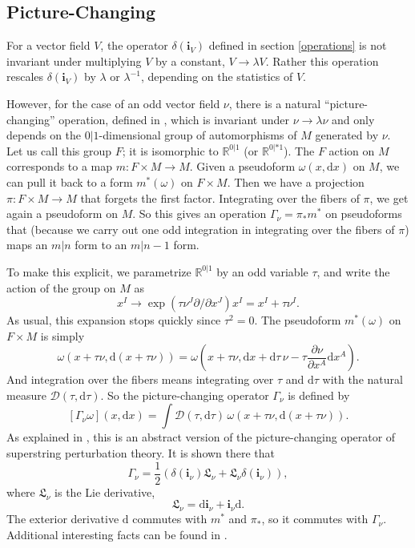 \documentclass[11pt,a4paper]{article}
\def\D{{\mathcal D}}
\def\d{{\mathrm d}}
\def\R{{\mathbb R}}
\def\D{{\mathcal D}}
\def\LL{{ \mathfrak L}}
\def\i{{\mathbf i}}
\begin{document}
\subsection{Picture-Changing}\label{picturechanging}

For a vector field $V$, the operator $\delta(\i_V)$ defined in section \ref{operations} is not invariant under multiplying $V$ by a constant, $V\to \lambda V$.
Rather this operation rescales $\delta(\i_V)$ by $\lambda$ or $\lambda^{-1}$, depending on the statistics of $V$.  

However, for the case of an odd vector field $\nu$, there is a natural ``picture-changing'' operation, defined in \cite{Beltwo}, which is invariant under $\nu\to\lambda\nu$
and only depends on the $0|1$-dimensional group of automorphisms of $M$ generated by $\nu$.  Let us call this group $F$; it is isomorphic to $\R^{0|1}$ (or
$\R^{0|*1}$).  
The $F$ action on $M$ corresponds to a map $m:F\times M\to M$.  Given a pseudoform $\omega(x,\d x)$ on $M$, we can pull it back to a form $m^*(\omega)$
on $F\times M$.  Then we have a projection $\pi:F\times M\to M$ that forgets the first factor.  Integrating over the fibers of $\pi$, we get again
a pseudoform on $M$.  So this gives an operation $\Gamma_\nu=\pi_*m^*$ on pseudoforms that (because we carry out one odd integration in integrating over the fibers of $\pi$)
maps an $m|n$ form to an $m|n-1$ form.    

To make this explicit, 
we parametrize
$\R^{0|1}$ by an odd variable $\tau$, and write the action of the group on $M$ as 
\begin{equation}\label{zolk}x^I\to \exp(\tau\nu^J\partial/\partial x^J) x^I= x^I+\tau\nu^I.\end{equation}
As usual, this expansion stops quickly since $\tau^2=0$.  
The pseudoform $m^*(\omega)$ on $F\times M$ is simply \begin{equation}\label{peneo}\omega(x+\tau\nu,\d(x+\tau\nu))=\omega\left(x+\tau\nu,
\d x+\d\tau\, \nu - \tau \frac{\partial\nu}{\partial x^A}\d x^A\right).\end{equation}
And integration over the fibers means integrating over $\tau$ and $\d\tau$ with the natural measure $\D(\tau,\d\tau)$.  So the picture-changing operator
$\Gamma_\nu$ is defined by
\begin{equation}\label{zobz}[\Gamma_\nu\omega](x,\d x)=\int \D(\tau,\d\tau) \,\omega(x+\tau \nu, \d(x+\tau\nu)).\end{equation}
As explained in \cite{Beltwo,Belthree}, this is an abstract version of the picture-changing operator of superstring perturbation theory.
It is shown there that
\begin{equation}\label{oboz}\Gamma_\nu=\frac{1}{2}\left(\delta(\i_\nu)\LL_\nu+\LL_\nu\delta(\i_\nu)\right), \end{equation}
where $\LL_\nu$ is the Lie derivative,
\begin{equation}\label{boz}\LL_\nu=\d\i_\nu+\i_\nu\d.\end{equation}
The exterior derivative $\d$ commutes with $m^*$ and $\pi_*$, so it commutes with $\Gamma_\nu$.  Additional interesting facts can be found
 in \cite{Beltwo}.     
                
\end{document}
